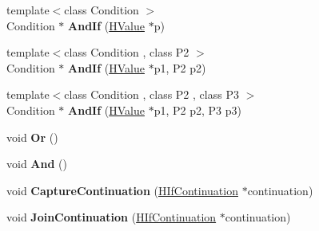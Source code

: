 \begin{DoxyCompactItemize}
\item 
{\footnotesize template$<$class Condition $>$ }\\Condition $\ast$ {\bfseries And\+If} (\hyperlink{classv8_1_1internal_1_1_h_value}{H\+Value} $\ast$p)\hypertarget{classv8_1_1internal_1_1_h_graph_builder_1_1_if_builder_a3770682d3415c563ad38518b7a18b2f5}{}\label{classv8_1_1internal_1_1_h_graph_builder_1_1_if_builder_a3770682d3415c563ad38518b7a18b2f5}

\item 
{\footnotesize template$<$class Condition , class P2 $>$ }\\Condition $\ast$ {\bfseries And\+If} (\hyperlink{classv8_1_1internal_1_1_h_value}{H\+Value} $\ast$p1, P2 p2)\hypertarget{classv8_1_1internal_1_1_h_graph_builder_1_1_if_builder_a4f29f12beb472ac8c46f5ebba8f691d6}{}\label{classv8_1_1internal_1_1_h_graph_builder_1_1_if_builder_a4f29f12beb472ac8c46f5ebba8f691d6}

\item 
{\footnotesize template$<$class Condition , class P2 , class P3 $>$ }\\Condition $\ast$ {\bfseries And\+If} (\hyperlink{classv8_1_1internal_1_1_h_value}{H\+Value} $\ast$p1, P2 p2, P3 p3)\hypertarget{classv8_1_1internal_1_1_h_graph_builder_1_1_if_builder_aa186f8bd0f73b604fc2b03202fbcd7f7}{}\label{classv8_1_1internal_1_1_h_graph_builder_1_1_if_builder_aa186f8bd0f73b604fc2b03202fbcd7f7}

\item 
void {\bfseries Or} ()\hypertarget{classv8_1_1internal_1_1_h_graph_builder_1_1_if_builder_a541fbe534a542694adbea5174ba5ae77}{}\label{classv8_1_1internal_1_1_h_graph_builder_1_1_if_builder_a541fbe534a542694adbea5174ba5ae77}

\item 
void {\bfseries And} ()\hypertarget{classv8_1_1internal_1_1_h_graph_builder_1_1_if_builder_a2582096df401802178f0605686e1fee9}{}\label{classv8_1_1internal_1_1_h_graph_builder_1_1_if_builder_a2582096df401802178f0605686e1fee9}

\item 
void {\bfseries Capture\+Continuation} (\hyperlink{classv8_1_1internal_1_1_h_if_continuation}{H\+If\+Continuation} $\ast$continuation)\hypertarget{classv8_1_1internal_1_1_h_graph_builder_1_1_if_builder_a697ef150c849ad42f7f1fc51d5be3213}{}\label{classv8_1_1internal_1_1_h_graph_builder_1_1_if_builder_a697ef150c849ad42f7f1fc51d5be3213}

\item 
void {\bfseries Join\+Continuation} (\hyperlink{classv8_1_1internal_1_1_h_if_continuation}{H\+If\+Continuation} $\ast$continuation)\hypertarget{classv8_1_1internal_1_1_h_graph_builder_1_1_if_builder_a1ed053bca95a51e468dd5f2ff251e337}{}\label{classv8_1_1internal_1_1_h_graph_builder_1_1_if_builder_a1ed053bca95a51e468dd5f2ff251e337}


\end{DoxyCompactItemize}
